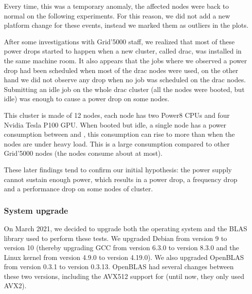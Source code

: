                 Every time, this was a temporary anomaly, the affected nodes were back to normal on the following
                experiments. For this reason, we did not add a new platform change for these events, instead we marked
                them as outliers in the plots.

                After some investigations with Grid'5000 staff, we realized that most of these power drops started to
                happen when a new cluster, called drac, was installed in the same machine room. It also appears that the
                jobs where we observed a power drop had been scheduled when most of the drac nodes were used, on the
                other hand we did not observe any drop when no job was scheduled on the drac nodes. Submitting an idle
                job on the whole drac cluster (\ie all the nodes were booted, but idle) was enough to cause a power drop
                on some \dahu nodes.

                This \drac cluster is made of 12 nodes, each node has two Power8 CPUs and four Nvidia Tesla P100 GPU.
                When booted but idle, a single node has a power consumption between  and
                , this consumption can rise to more than  when the nodes are under
                heavy load. This is a large consumption compared to other Grid'5000 nodes (the \dahu nodes consume about
                 at most).

                These later findings tend to confirm our initial hypothesis: the power supply cannot sustain enough
                power, which results in a power drop, a frequency drop and a performance drop on some nodes of \dahu
                cluster.

            \subsubsection{System upgrade}%

                On March 2021, we decided to upgrade both the operating system and the BLAS library used to perform
                these tests. We upgraded Debian from version 9 to version 10 (thereby upgrading GCC from version 6.3.0
                to version 8.3.0 and the Linux kernel from version 4.9.0 to version 4.19.0). We also upgraded OpenBLAS
                from version 0.3.1 to version 0.3.13.  OpenBLAS had several changes between these two versions,
                including the AVX512 support for \dgemm (until now, they only used AVX2).

